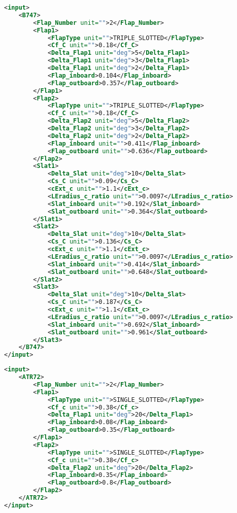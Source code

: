 \bigskip
\begin{lstlisting}[caption={Example of high-lift devices XML input file for the B747-100B in take-off configuration}, captionpos=b, tabsize=6, language=XML]
<input>
	<B747>
		<Flap_Number unit="">2</Flap_Number>
		<Flap1>
			<FlapType unit="">TRIPLE_SLOTTED</FlapType>
			<Cf_C unit="">0.18</Cf_C>
			<Delta_Flap1 unit="deg">5</Delta_Flap1>
			<Delta_Flap1 unit="deg">3</Delta_Flap1>
			<Delta_Flap1 unit="deg">2</Delta_Flap1>
			<Flap_inboard>0.104</Flap_inboard>
			<Flap_outboard>0.357</Flap_outboard>
		</Flap1>
		<Flap2>
			<FlapType unit="">TRIPLE_SLOTTED</FlapType>
			<Cf_C unit="">0.18</Cf_C>
			<Delta_Flap2 unit="deg">5</Delta_Flap2>
			<Delta_Flap2 unit="deg">3</Delta_Flap2>
			<Delta_Flap2 unit="deg">2</Delta_Flap2>
			<Flap_inboard unit="">0.411</Flap_inboard>
			<Flap_outboard unit="">0.636</Flap_outboard>
		</Flap2>
		<Slat1>
			<Delta_Slat unit="deg">10</Delta_Slat>
			<Cs_C unit="">0.09</Cs_C>
			<cExt_c unit="">1.1</cExt_c>
			<LEradius_c_ratio unit="">0.0097</LEradius_c_ratio>
			<Slat_inboard unit="">0.192</Slat_inboard>
			<Slat_outboard unit="">0.364</Slat_outboard>
		</Slat1>
		<Slat2>
			<Delta_Slat unit="deg">10</Delta_Slat>
			<Cs_C unit="">0.136</Cs_C>
			<cExt_c unit="">1.1</cExt_c>
			<LEradius_c_ratio unit="">0.0097</LEradius_c_ratio>
			<Slat_inboard unit="">0.414</Slat_inboard>
			<Slat_outboard unit="">0.648</Slat_outboard>
		</Slat2>
		<Slat3>
			<Delta_Slat unit="deg">10</Delta_Slat>
			<Cs_C unit="">0.187</Cs_C>
			<cExt_c unit="">1.1</cExt_c>
			<LEradius_c_ratio unit="">0.0097</LEradius_c_ratio>
			<Slat_inboard unit="">0.692</Slat_inboard>
			<Slat_outboard unit="">0.961</Slat_outboard>
		</Slat3>
	</B747>
</input>
\end{lstlisting}

\bigskip
\begin{lstlisting}[caption={Example of high-lift devices XML input file for the ATR-72 in take-off configuration}, captionpos=b, tabsize=6, language=XML]
<input>
	<ATR72>
		<Flap_Number unit="">2</Flap_Number>
		<Flap1>
			<FlapType unit="">SINGLE_SLOTTED</FlapType>
			<Cf_c unit="">0.38</Cf_c>
			<Delta_Flap1 unit="deg">20</Delta_Flap1>
			<Flap_inboard>0.08</Flap_inboard>
			<Flap_outboard>0.35</Flap_outboard>
		</Flap1>
		<Flap2>
			<FlapType unit="">SINGLE_SLOTTED</FlapType>
			<Cf_c unit="">0.38</Cf_c>
			<Delta_Flap2 unit="deg">20</Delta_Flap2>
			<Flap_inboard>0.35</Flap_inboard>
			<Flap_outboard>0.8</Flap_outboard>
		</Flap2>
	</ATR72>
</input>
\end{lstlisting}

